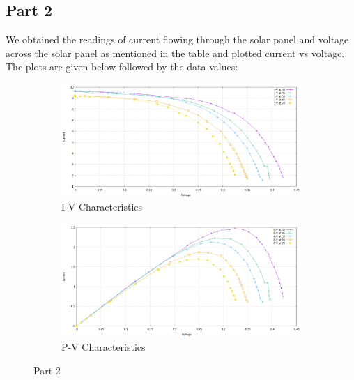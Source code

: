 \documentclass[12pt]{article}
\begin{document}
\subsection{Part 2}

We obtained the readings of current flowing through the solar panel and voltage across the solar panel as mentioned in the table and plotted current vs voltage.
The plots are given below followed by the data values: 
\begin{figure}[H]
	\begin{subfigure}[b]{\linewidth}
	   	\includegraphics[width = 0.77\linewidth, trim = {0 0 0 0}, clip]{Part2_IV.png}
		\caption{I-V Characteristics}
	\end{subfigure}
	\begin{subfigure}[b]{\linewidth}
		\includegraphics[width = 0.77\linewidth, trim = {0 0 0 0}, clip]{Part2_PV.png}
		\caption{P-V Characteristics}
	\end{subfigure} 
	\caption{Part 2}
\end{figure}
\end{document}
